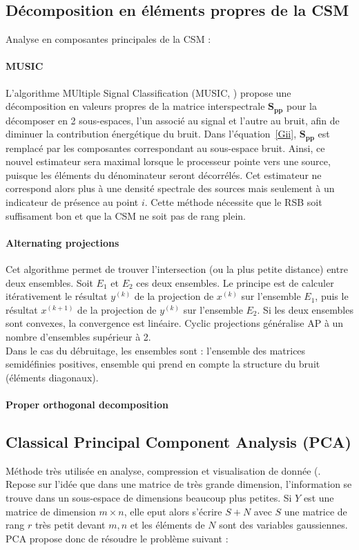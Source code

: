 \subsection{Décomposition en éléments propres de la CSM}
Analyse en composantes principales de la CSM : 
\paragraph{\tbullet MUSIC} L'algorithme MUltiple Signal Classification (MUSIC, \cite{Schmidt1986}) propose une décomposition en valeurs propres de la matrice interspectrale $\bm{S_{pp}}$ pour la décomposer en 2 sous-espaces, l’un associé au signal et l’autre au bruit, afin de diminuer la contribution énergétique du bruit.  Dans l'équation~\ref{Gii}, $\bm{S_{pp}}$ est remplacé par les composantes correspondant au sous-espace bruit. Ainsi, ce nouvel estimateur sera maximal lorsque le processeur pointe vers une source, puisque les éléments du dénominateur seront décorrélés. Cet estimateur ne correspond alors plus à une densité spectrale des sources mais seulement à un indicateur de présence au point $i$. Cette méthode nécessite que le RSB soit suffisament bon et que la CSM ne soit pas de rang plein.\\

\paragraph{\tbullet Alternating projections}
Cet algorithme permet de trouver l'intersection  (ou la plus petite distance) entre deux ensembles. Soit $E_1$ et $E_2$ ces deux ensembles. Le principe est de calculer itérativement le résultat $y^{(k)}$ de la projection de $x^{(k)}$ sur l'ensemble $E_1$, puis le résultat $x^{(k+1)}$ de la projection de $y^{(k)}$ sur l'ensemble $E_2$. Si les deux ensembles sont convexes, la convergence est linéaire.
Cyclic projections généralise AP à un nombre d'ensembles supérieur à 2.\\

Dans le cas du débruitage, les ensembles sont : l'ensemble des matrices semidéfinies positives, ensemble qui prend en compte la structure du bruit (éléments diagonaux).

\paragraph{\tbullet  Proper orthogonal decomposition}

\subsection{Classical Principal Component Analysis (PCA)}
Méthode très utilisée en analyse, compression et visualisation de donnée (. Repose sur l'idée que dans une matrice de très grande dimension, l'information  se trouve dans un sous-espace de dimensions beaucoup plus petites. Si $Y$ est une matrice de dimension $m \times n$, elle eput alors s'écrire $S + N$ avec $S$ une matrice de rang $r$ très petit devant $m,n$ et les éléments de $N$ sont des variables gaussiennes. PCA propose donc de résoudre le problème suivant : 

